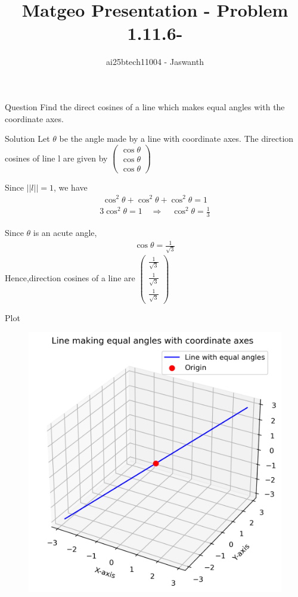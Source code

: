 \documentclass{beamer}
\title{Matgeo Presentation - Problem 1.11.6-}
\author{ai25btech11004 - Jaswanth}
\numberwithin{equation}{section}
\theoremstyle{remark}
\newcommand{\myvec}[1]{\ensuremath{\begin{pmatrix}#1\end{pmatrix}}}
\begin{document}
\frame{\titlepage}
\begin{frame}{Question}
Find the direct cosines of a line which makes equal angles with the coordinate axes.
\end{frame}

\begin{frame}{Solution}
Let $\theta$ be the angle made by a line with coordinate axes.  
The direction cosines of line l are given by  
$\myvec{ \cos\theta \\ \cos\theta \\ \cos\theta}$    

Since $||l|| = 1$, we have
\begin{align}
\cos^2 \theta + \cos^2 \theta + \cos^2 \theta = 1    
\end{align}
\begin{align}
3 \cos^2 \theta = 1 \quad \Rightarrow \quad \cos^2 \theta = \tfrac{1}{3}    
\end{align}


Since $\theta$ is an acute angle,
\begin{align}
\cos \theta = \frac{1}{\sqrt{3}}
\end{align}
Hence,direction cosines of a line are 
$\myvec{\tfrac{1}{\sqrt{3}} \\ \tfrac{1}{\sqrt{3}} \\ \tfrac{1}{\sqrt{3}}}$
\end{frame}
\begin{frame}{Plot}
    \begin{figure}[H]
    \centering
    \includegraphics[width=0.66\columnwidth]{figs/01.png}
    \label{fig-1}
\end{figure}
\end{frame}
\end{document}
